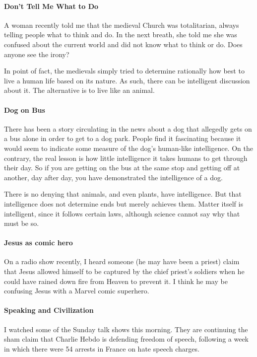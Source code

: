 \paragraph{Don't Tell Me What to Do}
A woman recently told me that the medieval Church was totalitarian, always telling people what to think and do. In the next breath, she told me she was confused about the current world and did not know what to think or do. Does anyone see the irony?

In point of fact, the medievals simply tried to determine rationally how best to live a human life based on its nature. As such, there can be intelligent discussion about it. The alternative is to live like an animal.

\paragraph{Dog on Bus}
There has been a story circulating in the news about a dog that allegedly gets on a bus alone in order to get to a dog park. People find it fascinating because it would seem to indicate some measure of the dog's human-like intelligence. On the contrary, the real lesson is how little intelligence it takes humans to get through their day. So if you are getting on the bus at the same stop and getting off at another, day after day, you have demonstrated the intelligence of a dog.

There is no denying that animals, and even plants, have intelligence. But that intelligence does not determine ends but merely achieves them. Matter itself is intelligent, since it follows certain laws, although science cannot say why that must be so.

\paragraph{Jesus as comic hero}
On a radio show recently, I heard someone (he may have been a priest) claim that Jesus allowed himself to be captured by the chief priest's soldiers when he could have rained down fire from Heaven to prevent it. I think he may be confusing Jesus with a Marvel comic superhero.

\paragraph{Speaking and Civilization}
I watched some of the Sunday talk shows this morning. They are continuing the sham claim that Charlie Hebdo is defending freedom of speech, following a week in which there were 54 arrests in France on hate speech charges.

